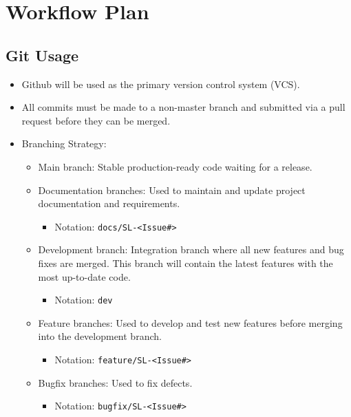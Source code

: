 \documentclass{article}
\begin{document}
\section{Workflow Plan}

\subsection{Git Usage}
\begin{itemize}
	\item Github will be used as the primary version control system (VCS).
    \item All commits must be made to a non-master branch and submitted via a pull request before they can be merged.
    \item Branching Strategy: \begin{itemize}
    \item Main branch: Stable production-ready code waiting for a release.
    \item Documentation branches: Used to maintain and update project documentation and requirements.
        \begin{itemize}
            \item Notation: \texttt{docs/SL-<Issue\#>}
        \end{itemize}

    \item Development branch: Integration branch where all new features and bug fixes are merged. This branch will contain the latest features with the most up-to-date code. 
        \begin{itemize}
            \item Notation: \texttt{dev}
        \end{itemize}

    \item Feature branches: Used to develop and test new features before merging into the development branch. 
        \begin{itemize}
            \item Notation: \texttt{feature/SL-<Issue\#>}
        \end{itemize}

    \item Bugfix branches: Used to fix defects.
        \begin{itemize}
            \item Notation: \texttt{bugfix/SL-<Issue\#>}
        \end{itemize}
\end{itemize}
\end{itemize}
\end{document}
